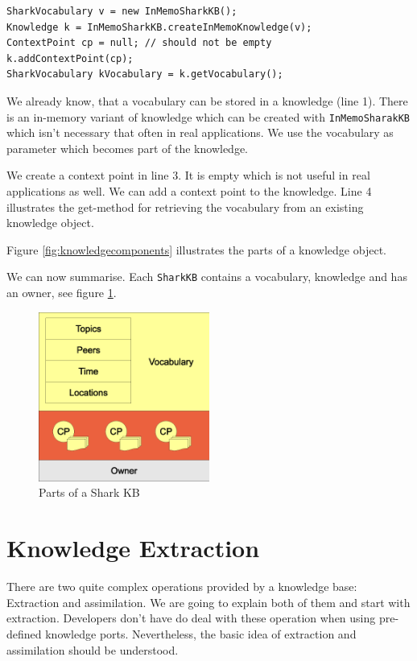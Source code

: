 \begin{verbatim}
SharkVocabulary v = new InMemoSharkKB();
Knowledge k = InMemoSharkKB.createInMemoKnowledge(v);
ContextPoint cp = null; // should not be empty
k.addContextPoint(cp);
SharkVocabulary kVocabulary = k.getVocabulary();
\end{verbatim}

We already know, that a vocabulary can be stored in a knowledge (line 1). There is an in-memory variant of knowledge which can be created with {\tt InMemoSharakKB} which isn't necessary that often in real applications. We use the vocabulary as parameter which becomes part of the knowledge.

We create a context point in line 3. It is empty which is not useful in real applications as well. We can add a context point to the knowledge. Line 4 illustrates the get-method for retrieving the vocabulary from an existing knowledge object.

Figure \ref{fig:knowledgecomponents} illustrates the parts of a knowledge object.


We can now summarise. Each {\tt SharkKB} contains a vocabulary, knowledge and has an owner, see figure \ref{fig:sharkkbcontent}.

\begin{figure}[t]
\centering
\includegraphics[width=0.50\textwidth]{sharkkbcontent.eps}
\caption{Parts of a Shark KB}
\label{fig:sharkkbcontent}
\end{figure}

\section{Knowledge Extraction}
\label{sec:extraction}
There are two quite complex operations provided by a knowledge base: Extraction and assimilation. We are going to explain both of them and start with extraction. Developers don't have do deal with these operation when using pre-defined knowledge ports. Nevertheless, the basic idea of extraction and assimilation should be understood.

